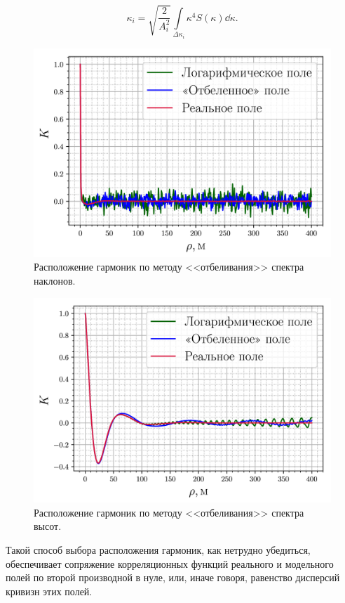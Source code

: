 \begin{equation}
    \label{eq:ki_slopes}
    \boxed{
        \kappa_i = \sqrt{\frac{2}{A_{i}^2}} \int\limits_{\Delta \kappa_i}
        \kappa^4 S(\kappa) \dd \kappa. 
    }
\end{equation}

\begin{figure}[ht]
    \centering
    \includegraphics[width=0.6\linewidth]{fig/correlation_angles_wa.png}
    \caption{ Расположение гармоник по методу <<отбеливания>> спектра
    наклонов. }
    \label{fig:nodes}
\end{figure}

\begin{figure}[ht]
    \centering
    \includegraphics[width=0.6\linewidth]{fig/correlation_height_wa.png}
    \caption{ Расположение гармоник по методу <<отбеливания>> спектра
    высот. }
\end{figure}
Такой способ выбора расположения гармоник, как нетрудно убедиться, обеспечивает
сопряжение корреляционных функций реального и модельного полей по второй
производной в нуле, или, иначе говоря, равенство дисперсий кривизн этих
полей.

